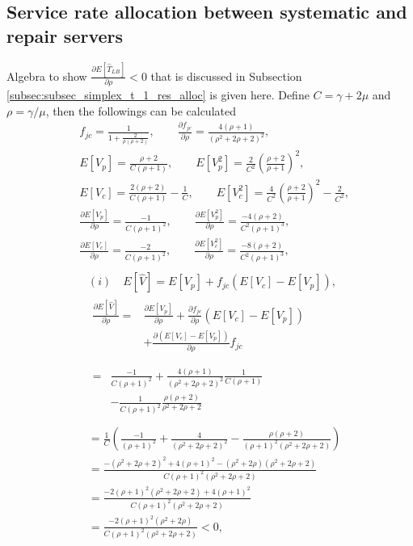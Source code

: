 \documentclass[sigconf,draft]{acmart}
\begin{document}
\subsection{Service rate allocation between systematic and repair servers}
\label{subsec:subsec_deriv_E_T_less_than_zero}
Algebra to show $\frac{\partial E[\hat{T}_{LB}]}{\partial \rho} < 0$ that is discussed in Subsection \ref{subsec:subsec_simplex_t_1_res_alloc} is given here. Define $C = \gamma+2\mu$ and $\rho = \gamma/\mu$, then the followings can be calculated
\begin{equation*}
  \begin{split}
  & f_{jc}=\frac{1}{1+\frac{2}{\rho(\rho+2)}}, \quad\quad \frac{\partial f_{jc}}{\partial \rho} = \frac{4(\rho+1)}{(\rho^2+2\rho+2)^2}, \\
  & E[V_p]=\frac{\rho+2}{C(\rho+1)}, \quad\quad E[V_p^2]=\frac{2}{C^2}(\frac{\rho+2}{\rho+1})^2, \\
  & E[V_c]=\frac{2(\rho+2)}{C(\rho+1)} - \frac{1}{C}, \quad\quad E[V_c^2]=\frac{4}{C^2}(\frac{\rho+2}{\rho+1})^2 - \frac{2}{C^2}, \\
  & \frac{\partial E[V_p]}{\partial \rho} = \frac{-1}{C(\rho+1)^2}, \quad\quad \frac{\partial E[V_p^2]}{\partial \rho} = \frac{-4(\rho+2)}{C^2(\rho+1)^3}, \\
  & \frac{\partial E[V_c]}{\partial \rho} = \frac{-2}{C(\rho+1)^2}, \quad\quad \frac{\partial E[V_c^2]}{\partial \rho} = \frac{-8(\rho+2)}{C^2(\rho+1)^3}, \\
  \end{split}
\end{equation*}
\begin{equation*}
  \begin{split}
  & (i)\quad E[\hat{V}] = E[V_p] + f_{jc}(E[V_c] - E[V_p]), \\
  & \begin{aligned}
    \frac{\partial E[\hat{V}]}{\partial \rho} =& \frac{\partial E[V_p]}{\partial \rho} + \frac{\partial f_{jc}}{\partial \rho}(E[V_c]-E[V_p]) \\
    &+ \frac{\partial (E[V_c]-E[V_p])}{\partial \rho}f_{jc} \\
    \end{aligned} \\
  & \begin{aligned}
    = &\frac{-1}{C(\rho+1)^2} + \frac{4(\rho+1)}{(\rho^2+2\rho+2)^2}\frac{1}{C(\rho+1)} \\
    &- \frac{1}{C(\rho+1)^2}\frac{\rho(\rho+2)}{\rho^2+2\rho+2} \\
    \end{aligned} \\
  &= \frac{1}{C}(\frac{-1}{(\rho+1)^2} + \frac{4}{(\rho^2+2\rho+2)^2} - \frac{\rho(\rho+2)}{(\rho+1)^2(\rho^2+2\rho+2)}) \\
  &= \frac{-(\rho^2+2\rho+2)^2 + 4(\rho+1)^2 - (\rho^2+2\rho)(\rho^2+2\rho+2)}{C(\rho+1)^2(\rho^2+2\rho+2)} \\
  &= \frac{-2(\rho+1)^2(\rho^2+2\rho+2) + 4(\rho+1)^2}{C(\rho+1)^2(\rho^2+2\rho+2)} \\
  &= \frac{-2(\rho+1)^2(\rho^2+2\rho)}{C(\rho+1)^2(\rho^2+2\rho+2)} < 0, \\
  \end{split}
\end{equation*}
\end{document}
